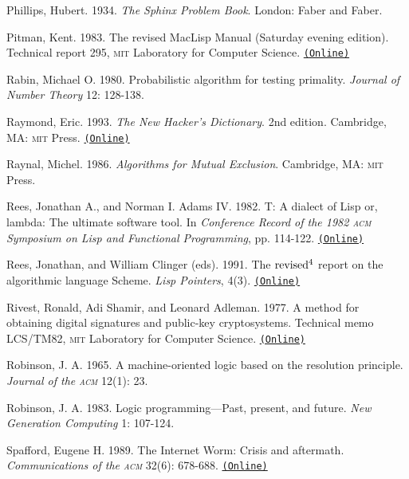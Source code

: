 \documentclass[oneside]{book}
\newcommand{\acronym}[1]{\textsc{\MakeLowercase{#1}}}
\newcommand{\code}[1]{\texttt{#1}}
\begin{document}
 \label{Phillips 1934}
Phillips, Hubert.  1934. \textit{The Sphinx Problem Book}.  London: Faber and
Faber.

 \label{Pitman 1983}
Pitman, Kent. 1983. The revised MacLisp Manual (Saturday evening edition).
Technical report 295, \acronym{MIT} Laboratory for Computer Science.
\href{http://maclisp.info/pitmanual}{\code{(Online)}}

 \label{Rabin 1980}
Rabin, Michael O. 1980. Probabilistic algorithm for testing primality.
\textit{Journal of Number Theory} 12: 128-138.

 \label{Raymond 1993}
Raymond, Eric.  1993. \textit{The New Hacker's Dictionary}. 2nd edition.
Cambridge, MA: \acronym{MIT} Press.
\href{http://www.outpost9.com/reference/jargon/jargon_toc.html}{\code{(Online)}}

Raynal, Michel. 1986. \textit{Algorithms for Mutual Exclusion}.  Cambridge, MA:
\acronym{MIT} Press.

 \label{Rees and Adams 1982}
Rees, Jonathan A., and Norman I. Adams IV. 1982.  T: A dialect of Lisp or,
lambda: The ultimate software tool.  In \textit{Conference Record of the 1982
\acronym{ACM} Symposium on Lisp and Functional Programming}, pp.  114-122.
\href{http://people.csail.mit.edu/riastradh/t/adams82t.pdf}{\code{(Online)}}

Rees, Jonathan, and William Clinger (eds). 1991.  The \( \rm revised^4 \) report on the
algorithmic language Scheme.  \textit{Lisp Pointers}, 4(3).
\href{http://people.csail.mit.edu/jaffer/r4rs_toc.html}{\code{(Online)}}

 \label{Rivest et al. (1977)}
Rivest, Ronald, Adi Shamir, and Leonard Adleman.  1977.  A method for obtaining
digital signatures and public-key cryptosystems. Technical memo LCS/TM82,
\acronym{MIT} Laboratory for Computer Science.
\href{http://people.csail.mit.edu/rivest/Rsapaper.pdf}{\code{(Online)}}

 \label{Robinson 1965}
Robinson, J. A. 1965.  A machine-oriented logic based on the resolution
principle.  \textit{Journal of the \acronym{ACM}} 12(1): 23.

 \label{Robinson 1983}
Robinson, J. A. 1983.  Logic programming---Past, present, and future.
\textit{New Generation Computing} 1: 107-124.

 \label{Spafford 1989}
Spafford, Eugene H.  1989.  The Internet Worm: Crisis and aftermath.
\textit{Communications of the \acronym{ACM}} 32(6): 678-688.
\href{http://citeseerx.ist.psu.edu/viewdoc/download?doi=10.1.1.123.8503&rep=rep1&type=pdf}{\code{(Online)}}
\end{document}
